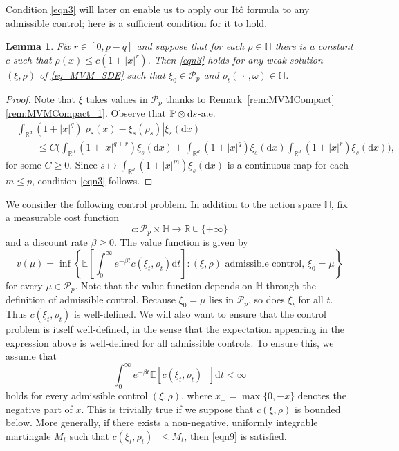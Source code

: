 \documentclass{article}
\newtheorem{lemma}[theorem]{Lemma}
\theoremstyle{definition}
\numberwithin{equation}{section}
\numberwithin{theorem}{section}
\newcommand{\E}{\mathbb{E}}
\renewcommand{\P}{\mathbb{P}}
\newcommand{\R}{\mathbb{R}}
\newcommand{\dx}{\mathrm{d}x}
\newcommand{\dt}{\mathrm{d}t}
\newcommand{\Hb}{\mathbb{H}}
\renewcommand{\d}{{\rm d}}
\renewcommand{\P}{{\mathbb P}}
\newcommand{\Pcal}{{\mathcal P}}
\newcommand{\fdot}{{\,\cdot\,}}
\begin{document}
Condition \eqref{eqn3} will later on enable us to apply our It{\^o} formula to any admissible control; here is a sufficient condition for it to hold.

\begin{lemma}\label{rem1}
Fix $r\in[0, p-q]$ and suppose that for each $\rho \in \mathbb H$ there is a constant $c$ such that $\rho(x)\leq c(1+|x|^r)$.  Then \eqref{eqn3} holds for any weak solution $(\xi,\rho)$ of \eqref{eq_MVM_SDE} such that $\xi_0 \in \Pcal_p$ and $\rho_t(\fdot,\omega)\in\Hb$.
\end{lemma}
\begin{proof}
Note that $\xi$ takes values in $\Pcal_p$ thanks to Remark~\ref{rem:MVMCompact}\ref{rem:MVMCompact_1}. Observe that $\P\otimes \d s$-a.e.
\begin{align*}
& \int_{\R^d} (1 + |x|^q) |\rho_s(x) - \xi_s(\rho_s)| \xi_s(\dx) \\
&\qquad \leq C \bigg(\int_{\R^d} (1+|x|^{q+r}) \xi_s(\dx)+\int_{\R^d} (1+|x|^{q}) \xi_s(\dx)\int_{\R^d} (1+|x|^{r}) \xi_s(\dx)\bigg),
\end{align*}
for some $C\geq0$. Since $s\mapsto\int_{\R^d} (1+|x|^{m}) \xi_s(\dx)$ is a continuous map for each $m\leq p$, condition \eqref{eqn3} follows.
\end{proof}


We consider the following control problem. In addition to the action space $\Hb$, fix a measurable cost function
\[
c\colon\Pcal_p\times\Hb\to\R \cup \{+\infty\}
\]
and a discount rate $\beta\ge0$. The value function is given by
\begin{equation}\label{eq_value_function}
v(\mu) = \inf\left\{  \E\left[ \int_0^\infty e^{-\beta t} c(\xi_t,\rho_t) \dt \right] \colon \text{$(\xi,\rho)$ admissible control, $\xi_0=\mu$}\right\}
\end{equation}
for every $\mu\in\Pcal_p$. Note that the value function depends on $\Hb$ through the definition of admissible control. Because $\xi_0=\mu$ lies in $\Pcal_p$, so does $\xi_t$ for all $t$. Thus $c(\xi_t,\rho_t)$ is well-defined. We will also want to ensure that the control problem is itself well-defined, in the sense that the expectation appearing in the expression above is well-defined for all admissible controls. To ensure this, we assume that
\begin{equation}\label{eqn9}
\int_0^\infty e^{-\beta t} \E\left[c(\xi_t,\rho_t)_-\right] \dt<\infty
\end{equation}
holds for every admissible control $(\xi, \rho)$, where $x_- = \max\{0, -x\}$ denotes the negative part of $x$.
%
This is trivially true if we suppose that $c(\xi,\rho)$ is bounded below. More generally, if there exists a non-negative, uniformly integrable martingale $M_t$ such that $c(\xi_t,\rho_t)_- \le M_t$, then \eqref{eqn9} is satisfied.
\end{document}
